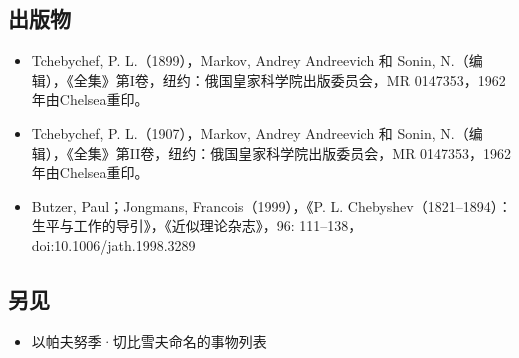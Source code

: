 \subsection{出版物}
\begin{itemize}
\item Tchebychef, P. L.（1899），Markov, Andrey Andreevich 和 Sonin, N.（编辑），《全集》第I卷，纽约：俄国皇家科学院出版委员会，MR 0147353，1962年由Chelsea重印。
\item Tchebychef, P. L.（1907），Markov, Andrey Andreevich 和 Sonin, N.（编辑），《全集》第II卷，纽约：俄国皇家科学院出版委员会，MR 0147353，1962年由Chelsea重印。
\item Butzer, Paul；Jongmans, Francois（1999），《P. L. Chebyshev（1821–1894）：生平与工作的导引》，《近似理论杂志》，96: 111–138，doi:10.1006/jath.1998.3289
\end{itemize}
\subsection{另见}
\begin{itemize}
\item 以帕夫努季·切比雪夫命名的事物列表
\end{itemize}
